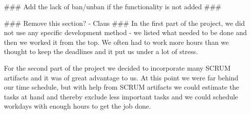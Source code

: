 \#\#\# Add the lack of ban/unban if the functionality is not added \#\#\#

\#\#\# Remove this section? - Claus \#\#\#
In the first part of the project, we did not use any specific development method - we listed what needed to be done and then we worked it from the top. We often had to work more hours than we thought to keep the deadlines and it put us under a lot of stress.

For the second part of the project we decided to incorporate many SCRUM artifacts and it was of great advantage to us. At this point we were far behind our time schedule, but with help from SCRUM artifacts we could estimate the tasks at hand and thereby exclude less important tasks and we could schedule workdays with enough hours to get the job done.
\newpage